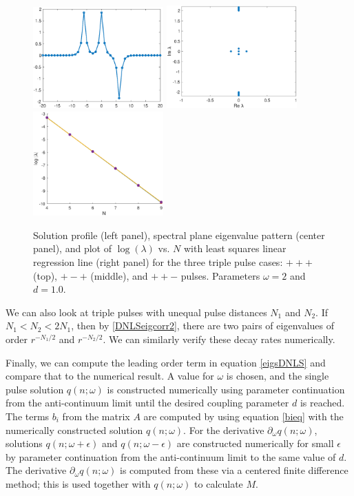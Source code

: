 \documentclass[12pt]{elsarticle}
\begin{document}
\begin{figure}
\includegraphics[width=5cm]{dnlsPPM.eps}
\includegraphics[width=5cm]{dnlsPPMeig.eps}
\includegraphics[width=5cm]{dnlsPPMdecay.eps}
\caption{Solution profile (left panel), spectral plane eigenvalue pattern (center panel), and plot of $\log(\lambda)$ vs. $N$ with least squares linear regression line (right panel) for the three triple pulse cases: $+++$ (top), $+-+$ (middle), and $++-$ pulses. Parameters $\omega = 2$ and $d = 1.0$.}
\label{fig:eigendecay2}
\end{figure}

We can also look at triple pulses with unequal pulse distances $N_1$ and $N_2$. If $N_1 < N_2 < 2 N_1$, then by \cref{DNLSeigcorr2}, there are two pairs of eigenvalues of order $r^{-N_1/2}$ and $r^{-N_2/2}$. We can similarly verify these decay rates numerically.

Finally, we can compute the leading order term in equation \cref{eigsDNLS} and compare that to the numerical result. A value for $\omega$ is chosen, and the single pulse solution $q(n; \omega)$ is constructed numerically using parameter continuation from the anti-continuum limit until the desired coupling parameter $d$ is reached. The terms $b_i$ from the matrix $A$ are computed by using equation \cref{bieq} with the numerically constructed solution $q(n; \omega)$. For the derivative $\partial_\omega q(n; \omega)$, solutions $q(n; \omega + \epsilon)$ and $q(n; \omega - \epsilon)$ are constructed numerically for small $\epsilon$ by parameter continuation from the anti-continuum limit to the same value of $d$. The derivative $\partial_\omega q(n; \omega)$ is computed from these via a centered finite difference method; this is used together with $q(n; \omega)$ to calculate $M$. 
\end{document}
